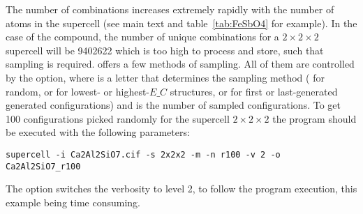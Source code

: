 \documentclass[a4paper,10pt]{article}
\begin{document}
The number of combinations increases extremely rapidly with the number of atoms in the supercell (see main text and table~\ref{tab:FeSbO4} for example). In the case of the  compound, the number of unique combinations for a $2\times2\times2$ supercell will be \num{9402622} which is too high to process and store, such that sampling is required. \Sups{} offers a few methods of sampling. All of them are controlled by the  option, where  is a letter that determines the sampling method ( for random,  or  for lowest- or highest-$E\_C$ structures,  or  for first or last-generated generated configurations) and  is the number of sampled configurations. To get \num{100} configurations picked randomly for the supercell $2\times2\times2$ the program should be executed with the following parameters:
\begin{Verbatim}[breaklines]
supercell -i Ca2Al2SiO7.cif -s 2x2x2 -m -n r100 -v 2 -o Ca2Al2SiO7_r100
\end{Verbatim}
The option  switches the verbosity to level 2, to follow the program execution, this example being time consuming.
\end{document}
